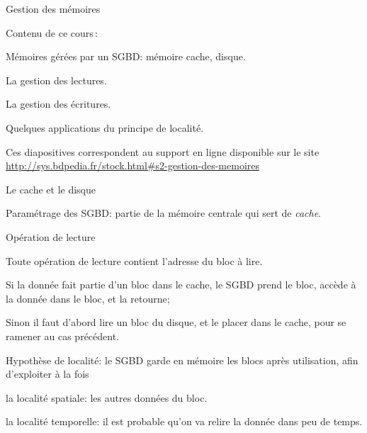 

\begin{frame}[fragile]{Gestion des mémoires}

Contenu de ce cours\,:

\begin{redbullet}
   \item Mémoires gérées par un SGBD: mémoire cache, disque.

  \item La gestion des lectures.

  \item La gestion des écritures.
  
  \item Quelques applications du principe de localité.
\end{redbullet}


\vfill
\begin{blocgauche}
\alert{Ces diapositives correspondent au support en ligne disponible sur
le site \url{http://sys.bdpedia.fr/stock.html\#s2-gestion-des-memoires}}
\end{blocgauche}

\end{frame}


\begin{frame}{Le cache et le disque}

Paramétrage des SGBD: partie de la mémoire centrale qui sert de {\it cache}.

\vfill



\end{frame}


\begin{frame}{Opération de lecture}

Toute opération de lecture contient l'adresse du bloc à lire. 

\begin{redbullet}
   \item \alert{Si la donnée fait partie d'un bloc dans le cache}, 
      le SGBD prend le bloc, accède à la donnée dans le bloc,  et la retourne;
   \item  \alert{Sinon} il faut d'abord lire un bloc du disque, et le placer dans le cache, 
   pour se ramener au cas précédent.
\end{redbullet}

\vfill

\begin{blocgauche}
\alert{Hypothèse de localité}: le SGBD garde en mémoire
les blocs après utilisation, afin d'exploiter 
à la fois 

\begin{redbullet}
  \item la \alert{localité spatiale}: les autres données du bloc.
   \item la \alert{localité temporelle}: il est probable qu'on va relire la donnée dans peu de temps.
\end{redbullet}
\end{blocgauche}
\end{frame}

